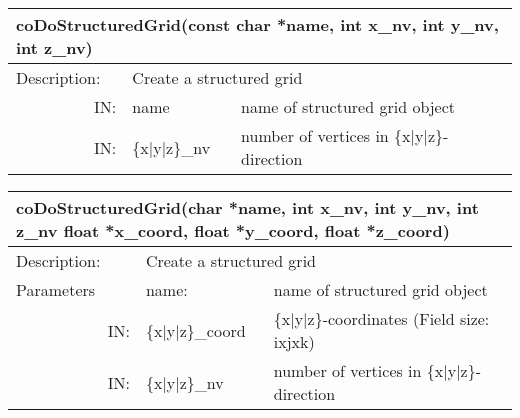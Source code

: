 \begin{htmlonly}
\begin{longtable}{|p{4cm}|p{2.5cm}|p{7cm}|}
\hline
\multicolumn{3}{|p{13.5cm}|}{\bf coDoStructuredGrid(const char *name, int x\_nv, int y\_nv, int z\_nv)  }\\
\hline
{Description:}  
           & \multicolumn{2}{p{9.5cm}|}{Create a structured grid} \\
\hline
\multicolumn{1}{|r|}{IN:} & \multicolumn{1}{p{3cm}|}{name} 
                          & \multicolumn{1}{p{5cm}|}{name of structured grid object}\\
\hline
\multicolumn{1}{|r|}{IN:} & \multicolumn{1}{p{3cm}|}{\{x|y|z\}\_nv} 
                          & \multicolumn{1}{p{5cm}|}{number of vertices in 
			  \{x|y|z\}-direction}\endhead
\hline
\end{longtable}
\end{htmlonly}

\latexonly
\begin{longtable}{|p{4cm}|p{2.5cm}|p{7cm}|}
\hline
\multicolumn{3}{|p{13.5cm}|}{\bf coDoStructuredGrid(char *name, int x\_nv, int y\_nv, int z\_nv \newline 
         float *x\_coord, float *y\_coord, float *z\_coord)}\\
\hline
{Description:}  
           & \multicolumn{2}{p{9.5cm}|}{Create a structured grid} \\
\hline
{Parameters} & \multicolumn{1}{p{3cm}|}{name:} 
                          & \multicolumn{1}{p{5cm}|}{name of structured grid object}\\
\hline
\multicolumn{1}{|r|}{IN:} & \multicolumn{1}{p{3cm}|}{\{x$\mid$y$\mid$z\}\_coord} 
                          & \multicolumn{1}{p{5cm}|}{\{x$\mid$y$\mid$z\}-coordinates
			   (Field size: ixjxk)}\\
\hline
\multicolumn{1}{|r|}{IN:} & \multicolumn{1}{p{3cm}|}{\{x$\mid$y$\mid$z\}\_nv} 
                          & \multicolumn{1}{p{5cm}|}{number of vertices in
			  \{x$\mid$y$\mid$z\}-direction}\endhead
\hline
\end{longtable}
\endlatexonly

